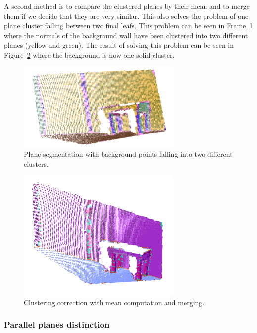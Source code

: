 \documentclass[fontsize=12pt]{article}
\begin{document}
A second method is to compare the clustered planes by their mean and to merge them if we decide that they are very similar. This also solves the problem of one plane cluster falling between two final leafs. This problem can be seen in Frame~\ref{fig:premergin} where the normals of the background wall have been clustered into two different planes (yellow  and green). The result of solving this problem can be seen in Figure~\ref{fig:posmerging} where the background is now one solid cluster.\\ 


\begin{figure}[!htbp]
  \begin{center}
    \includegraphics[width=8cm]{./images/premergingSegmentation.png}
    \caption{Plane segmentation with background points falling into two different clusters.}
    \label{fig:premergin}
  \end{center}
\end{figure}

\begin{figure}[!htbp]
  \begin{center}
    \includegraphics[width=8cm]{./images/midSegmentation.png}
    \caption{Clustering correction with mean computation and merging.}
    \label{fig:posmerging}
  \end{center}
\end{figure}

\subsubsection{Parallel planes distinction}
\end{document}
